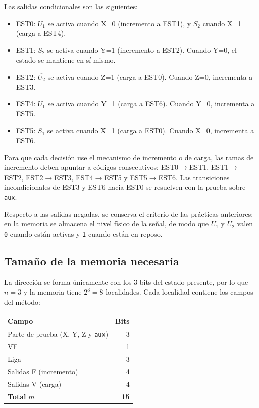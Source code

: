 Las salidas condicionales son las siguientes:

\begin{itemize}
  \item EST0: $\overline{U_1}$ se activa cuando X=0 (incremento a EST1), y $S_2$ cuando X=1 (carga a EST4).
  \item EST1: $S_2$ se activa cuando Y=1 (incremento a EST2). Cuando Y=0, el estado se mantiene en sí mismo.
  \item EST2: $\overline{U_2}$ se activa cuando Z=1 (carga a EST0). Cuando Z=0, incrementa a EST3.
  \item EST4: $\overline{U_1}$ se activa cuando Y=1 (carga a EST6). Cuando Y=0, incrementa a EST5.
  \item EST5: $S_1$ se activa cuando X=1 (carga a EST0). Cuando X=0, incrementa a EST6.
\end{itemize}

Para que cada decisión use el mecanismo de incremento o de carga, las ramas de incremento deben
apuntar a códigos consecutivos: EST0$\to$EST1, EST1$\to$EST2, EST2$\to$EST3, EST4$\to$EST5 y
EST5$\to$EST6. Las transiciones incondicionales de EST3 y EST6 hacia EST0 se resuelven con la
prueba sobre \texttt{aux}.

Respecto a las salidas negadas, se conserva el criterio de las prácticas anteriores: en la memoria
se almacena el nivel físico de la señal, de modo que $\overline{U_1}$ y $\overline{U_2}$ valen
\texttt{0} cuando están activas y \texttt{1} cuando están en reposo.

\subsection{Tamaño de la memoria necesaria}

La dirección se forma únicamente con los 3 bits del estado presente, por lo que $n = 3$ y la
memoria tiene $2^3 = 8$ localidades. Cada localidad contiene los campos del método:

\begin{center}
\begin{tabular}{@{}l r@{}}
\toprule
\textbf{Campo} & \textbf{Bits} \\
\midrule
Parte de prueba (X, Y, Z y \texttt{aux}) & 3 \\
VF                                       & 1 \\
Liga                                     & 3 \\
Salidas F (incremento)                   & 4 \\
Salidas V (carga)                        & 4 \\
\midrule
\textbf{Total} $m$                       & \textbf{15} \\
\bottomrule
\end{tabular}
\end{center}

